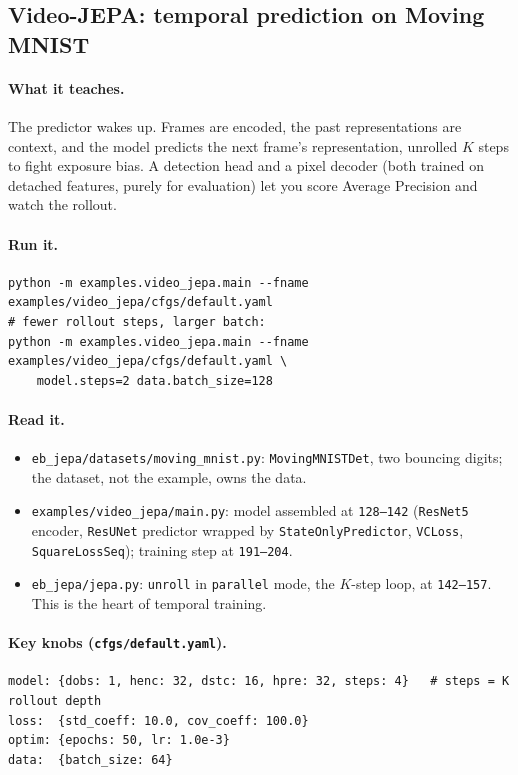 \documentclass{article}
\newcommand{\code}[1]{\texttt{\small #1}}
\newcommand{\file}[1]{\texttt{\small #1}}
\begin{document}
\subsection{Video-JEPA: temporal prediction on Moving MNIST}
\label{sec:video}

\paragraph{What it teaches.} The predictor wakes up. Frames are encoded, the past
representations are context, and the model predicts the next frame's
representation, unrolled $K$ steps to fight exposure bias. A detection head and a
pixel decoder (both trained on detached features, purely for evaluation) let you
score Average Precision and watch the rollout.

\paragraph{Run it.}
\begin{lstlisting}[style=bash]
python -m examples.video_jepa.main --fname examples/video_jepa/cfgs/default.yaml
# fewer rollout steps, larger batch:
python -m examples.video_jepa.main --fname examples/video_jepa/cfgs/default.yaml \
    model.steps=2 data.batch_size=128
\end{lstlisting}

\paragraph{Read it.}
\begin{itemize}[leftmargin=1.4em,itemsep=1pt,topsep=2pt]
  \item \file{eb\_jepa/datasets/moving\_mnist.py}: \code{MovingMNISTDet}, two
    bouncing digits; the dataset, not the example, owns the data.
  \item \file{examples/video\_jepa/main.py}: model assembled at \code{128--142}
    (\code{ResNet5} encoder, \code{ResUNet} predictor wrapped by
    \code{StateOnlyPredictor}, \code{VCLoss}, \code{SquareLossSeq}); training step
    at \code{191--204}.
  \item \file{eb\_jepa/jepa.py}: \code{unroll} in \code{parallel} mode, the
    $K$-step loop, at \code{142--157}. This is the heart of temporal training.
\end{itemize}

\paragraph{Key knobs (\code{cfgs/default.yaml}).}
\begin{lstlisting}[style=yml]
model: {dobs: 1, henc: 32, dstc: 16, hpre: 32, steps: 4}   # steps = K rollout depth
loss:  {std_coeff: 10.0, cov_coeff: 100.0}
optim: {epochs: 50, lr: 1.0e-3}
data:  {batch_size: 64}
\end{lstlisting}
\end{document}
